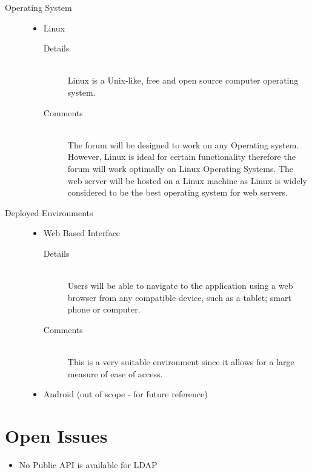 \documentclass[10pt]{article}
\begin{document}
\begin{description}
\begin{itemize}
\begin{description}
					\end{description}
			\end{itemize}	
		\item[Operating System] \hfill 
			\begin{itemize}
				\item Linux
					\begin{description}
						\item[Details] \hfill \\ 
                                                        Linux is a Unix-like, free and open source computer operating system.
						\item[Comments]\hfill \\
                                                        The forum will  be designed to work on any Operating system. However, Linux is ideal for certain functionality therefore the forum will work optimally on Linux Operating Systems. The web server will be hosted on a Linux machine as Linux is widely considered to be the best operating system  for web servers.
					\end{description}
			\end{itemize}	
		\item[Deployed Environments] \hfill 
			\begin{itemize}
				\item Web Based Interface
					\begin{description}
						\item[Details] \hfill \\
							Users will be able to navigate to the application using a web browser from any compatible device, such as a tablet; smart phone or computer.
						\item[Comments]\hfill \\
							This is a very suitable environment since it allows for a large measure of ease of access.
					\end{description}
				\item Android (out of scope - for future reference)

			\end{itemize}
\end{description}	
\section{Open Issues}
\begin{itemize}
\item No Public API is available for LDAP
\end{itemize}
\end{document}
